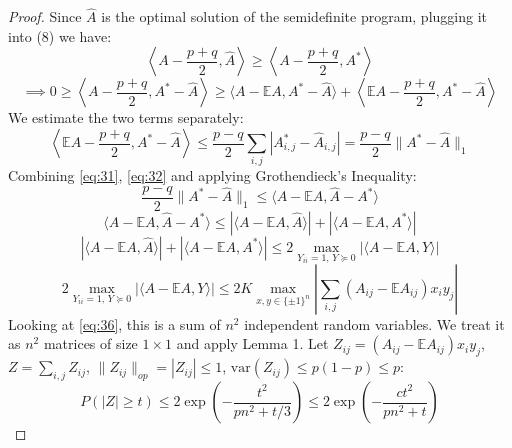 \begin{proof}
Since $\hat{A}$ is the optimal solution of the semidefinite program, plugging it into (8) we have:
\begin{equation}
\label{eq:31}
\left\langle A - \frac{p+q}{2}, \hat{A} \right\rangle \geq \left\langle A - \frac{p+q}{2}, A^* \right\rangle
\end{equation}
\begin{equation}
\label{eq:32}
\implies 0 \geq \left\langle A - \frac{p+q}{2}, A^* - \hat{A} \right\rangle \geq \langle A - \mathbb{E}A, A^* - \hat{A} \rangle + \left\langle \mathbb{E}A - \frac{p+q}{2}, A^* - \hat{A} \right\rangle
\end{equation}
We estimate the two terms separately:
\begin{equation}
\label{eq:33}
\left\langle \mathbb{E}A - \frac{p+q}{2}, A^* - \hat{A} \right\rangle \leq \frac{p-q}{2} \sum_{i,j} |A^*_{i,j} - \hat{A}_{i,j}| = \frac{p-q}{2} \|A^* - \hat{A}\|_1
\end{equation}
Combining \eqref{eq:31}, \eqref{eq:32} and applying Grothendieck’s Inequality:
\begin{equation}
\label{eq:34}
\frac{p-q}{2} \|A^* - \hat{A}\|_1 \leq \langle A - \mathbb{E}A, \hat{A} - A^* \rangle
\end{equation}
\begin{equation}
\label{eq:35}
\langle A - \mathbb{E}A, \hat{A} - A^* \rangle
\leq |\langle A - \mathbb{E}A, \hat{A} \rangle| + |\langle A - \mathbb{E}A, A^* \rangle|
\end{equation}
\begin{equation}
\label{eq:36}
|\langle A - \mathbb{E}A, \hat{A} \rangle| + |\langle A - \mathbb{E}A, A^* \rangle|
\leq 2 \max_{Y_{ii}=1,\, Y \succeq 0} |\langle A - \mathbb{E}A, Y \rangle|
\end{equation}
\begin{equation}
\label{eq:37}
2 \max_{Y_{ii}=1,\, Y \succeq 0} |\langle A - \mathbb{E}A, Y \rangle|
\leq 2K \max_{x, y \in \{\pm 1\}^n} \left| \sum_{i,j} (A_{ij} - \mathbb{E}A_{ij}) x_i y_j \right|
\end{equation}
Looking at \eqref{eq:36}, this is a sum of $n^2$ independent random variables. We treat it as $n^2$ matrices of size $1 \times 1$ and apply Lemma 1. Let $Z_{ij} = (A_{ij} - \mathbb{E}A_{ij}) x_i y_j$, $Z = \sum_{i,j} Z_{ij}$, $\|Z_{ij}\|_{op} = |Z_{ij}| \leq 1$, $\mathrm{var}(Z_{ij}) \leq p(1-p) \leq p$:
\begin{equation*}
\label{eq:38}
P(|Z| \geq t) \leq 2 \exp\left(-\frac{t^2}{pn^2 + t/3}\right) \leq 2 \exp\left(-\frac{ct^2}{pn^2 + t}\right)

\end{equation*}
\end{proof}
